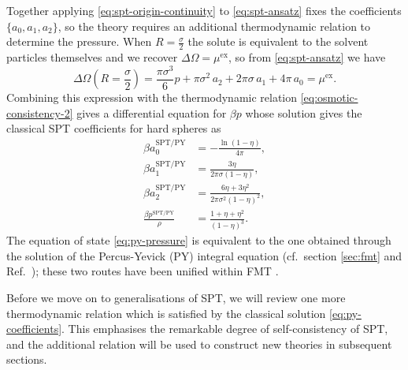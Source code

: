 \documentclass[11pt,twoside]{report}
\begin{document}
Together applying \eqref{eq:spt-origin-continuity} to \eqref{eq:spt-ansatz} fixes the coefficients $\{a_0, a_1, a_2\}$, so the theory requires an additional thermodynamic relation to determine the pressure.
When $R = \frac{\sigma}{2}$ the solute is equivalent to the solvent particles themselves and we recover $\Delta\Omega = \mu^\mathrm{ex}$, so from \eqref{eq:spt-ansatz} we have
\begin{equation}\label{eq:spt-mu}
  \Delta\Omega\left(R=\frac{\sigma}{2}\right) =
  \frac{\pi \sigma^3}{6} p
  + \pi \sigma^2 \, a_2
  + 2 \pi \sigma \, a_1
  + 4\pi \, a_0
  =
  \mu^\mathrm{ex}.
\end{equation}
Combining this expression with the thermodynamic relation \eqref{eq:osmotic-consistency-2} gives a differential equation for $\beta p$ whose solution gives the classical SPT coefficients for hard spheres as \cite{ReissJCP1959,LebowitzJCP1965}
\begin{subequations}\label{eq:py-coefficients}
  \begin{align}
    \beta a_0^\mathrm{SPT/PY}
    &=
    -\frac{\ln{(1- \eta)}}{4\pi}, \\
    \beta a_1^\mathrm{SPT/PY}
    &=
    \frac{3\eta}{2\pi \sigma (1- \eta)},
    \\
    \beta a_2^\mathrm{SPT/PY}
    &=
    \frac{6\eta + 3\eta^2}{2\pi \sigma^2 (1- \eta)^2},
    \\
    \frac{\beta p^\mathrm{SPT/PY}}{\rho}
    &=
    \frac{1 + \eta + \eta^2}{(1 - \eta)^3}.
    \label{eq:py-pressure}
 \end{align}
\end{subequations}
The equation of state \eqref{eq:py-pressure} is equivalent to the one obtained through the solution of the Percus-Yevick (PY) integral equation (cf.\ section \ref{sec:fmt} and Ref.\ \cite{WertheimPRL1963}); these two routes have been unified within FMT \cite{RosenfeldPRL1989}.

Before we move on to generalisations of SPT, we will review one more thermodynamic relation which is satisfied by the classical solution \eqref{eq:py-coefficients}.
This emphasises the remarkable degree of self-consistency of SPT, and the additional relation will be used to construct new theories in subsequent sections.
\end{document}
